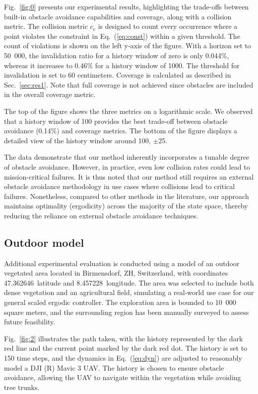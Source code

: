 \documentclass[letterpaper,10pt,conference,twoside]{IEEEtran}
\theoremstyle{definition}
\begin{document}
Fig.~\ref{fig:0} presents our experimental results, highlighting the trade-offs between built-in obstacle avoidance capabilities and coverage, along with a collision metric. The collision metric $c_e$ is designed to count every occurrence where a point violates the constraint in Eq.~(\ref{eq:const}) within a given threshold. The count of violations is shown on the left y-axis of the figure. With a horizon set to 50~000, the invalidation ratio for a history window of zero is only 0.044\%, whereas it increases to 0.46\% for a history window of 1000. The threshold for invalidation is set to 60 centimeters. Coverage is calculated as described in Sec.~\ref{sec:res1}. Note that full coverage is not achieved since obstacles are included in the overall coverage metric.

The top of the figure shows the three metrics on a logarithmic scale. We observed that a history window of 100 provides the best trade-off between obstacle avoidance (0.14\%) and coverage metrics. The bottom of the figure displays a detailed view of the history window around 100, $\pm$25.

The data demonstrate that our method inherently incorporates a tunable degree of obstacle avoidance. However, in practice, even low collision rates could lead to mission-critical failures. It is thus noted that our method still requires an external obstacle avoidance methodology in use cases where collisions lead to critical failures. Nonetheless, compared to other methods in the literature, our approach maintains optimality (ergodicity) across the majority of the state space, thereby reducing the reliance on external obstacle avoidance techniques.

\subsection{Outdoor model}\label{sec:res3}
\noindent
Additional experimental evaluation is conducted using a model of an outdoor vegetated area located in Birmensdorf, ZH, Switzerland, with coordinates 47.362646\textdegree~latitude and 8.457228\textdegree~longitude. The area was selected to include both dense vegetation and an agricultural field, simulating a real-world use case for our general scaled ergodic controller. The exploration area is bounded to 10~000 square meters, and the surrounding region has been manually surveyed to assess future feasibility.

Fig.~\ref{fig:2} illustrates the path taken, with the history represented by the dark red line and the current point marked by the dark red dot. The history is set to 150 time steps, and the dynamics in Eq.~(\ref{eq:dyn}) are adjusted to reasonably model a DJI (R) Mavic 3 UAV. The history is chosen to ensure obstacle avoidance, allowing the UAV to navigate within the vegetation while avoiding tree trunks.
\end{document}
